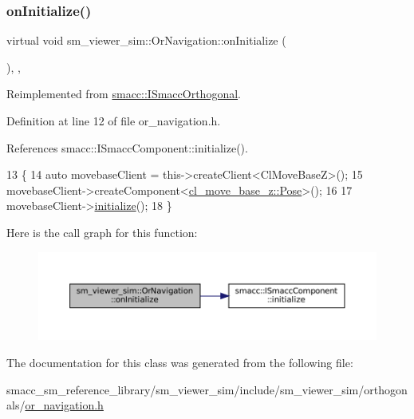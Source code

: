 \subsubsection{\texorpdfstring{on\+Initialize()}{onInitialize()}}
{\footnotesize\ttfamily virtual void sm\+\_\+viewer\+\_\+sim\+::\+Or\+Navigation\+::on\+Initialize (\begin{DoxyParamCaption}{ }\end{DoxyParamCaption})\hspace{0.3cm}{\ttfamily [inline]}, {\ttfamily [override]}, {\ttfamily [virtual]}}



Reimplemented from \hyperlink{classsmacc_1_1ISmaccOrthogonal_a6bb31c620cb64dd7b8417f8705c79c7a}{smacc\+::\+I\+Smacc\+Orthogonal}.



Definition at line 12 of file or\+\_\+navigation.\+h.



References smacc\+::\+I\+Smacc\+Component\+::initialize().


\begin{DoxyCode}
13     \{
14         \textcolor{keyword}{auto} movebaseClient = this->createClient<ClMoveBaseZ>();
15         movebaseClient->createComponent<\hyperlink{classcl__move__base__z_1_1Pose}{cl\_move\_base\_z::Pose}>();
16 
17         movebaseClient->\hyperlink{classsmacc_1_1ISmaccComponent_a3378552cb1a86aa26a07c0edc057448b}{initialize}();
18     \}
\end{DoxyCode}
Here is the call graph for this function\+:
\nopagebreak
\begin{figure}[H]
\begin{center}
\leavevmode
\includegraphics[width=350pt]{classsm__viewer__sim_1_1OrNavigation_a6f39ecbb3c1ad253c283588df860a8c4_cgraph}
\end{center}
\end{figure}


The documentation for this class was generated from the following file\+:\begin{DoxyCompactItemize}
\item 
smacc\+\_\+sm\+\_\+reference\+\_\+library/sm\+\_\+viewer\+\_\+sim/include/sm\+\_\+viewer\+\_\+sim/orthogonals/\hyperlink{sm__viewer__sim_2include_2sm__viewer__sim_2orthogonals_2or__navigation_8h}{or\+\_\+navigation.\+h}\end{DoxyCompactItemize}
